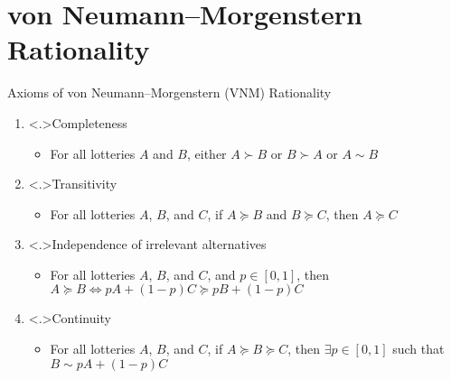 \documentclass[11pt,aspectratio=169]{beamer}
\begin{document}
  \section{von Neumann–Morgenstern Rationality}
  \begin{frame}{Axioms of von Neumann–Morgenstern (VNM) Rationality}
   \begin{enumerate}[<+->]
    \setlength{\itemsep}{1em}
    \item \alert<.>{Completeness}
    \begin{itemize}[<.->]
     \item For all lotteries $A$ and $B$, either $A \succ B$ or $B \succ A$ or $A\sim B$
    \end{itemize}
    \item \alert<.>{Transitivity}
    \begin{itemize}[<.->]
     \item For all lotteries $A$, $B$, and $C$, if $A \succeq B$ and $B \succeq C$, then $A \succeq C$
    \end{itemize}
    \item \alert<.>{Independence of irrelevant alternatives}
    \begin{itemize}[<.->]
     \item For all lotteries $A$, $B$, and $C$, and $p\in [0,1]$, then $A\succeq B \Longleftrightarrow pA + (1-p)C \succeq pB + (1-p)C$
    \end{itemize}
    \item \alert<.>{Continuity}
    \begin{itemize}[<.->]
     \item For all lotteries $A$, $B$, and $C$, if $A \succeq B \succeq C$, then $ \exists p \in [0,1]$ such that $B \sim pA + (1-p)C$
    \end{itemize}
   \end{enumerate}   
  \end{frame}
  
\end{document}
